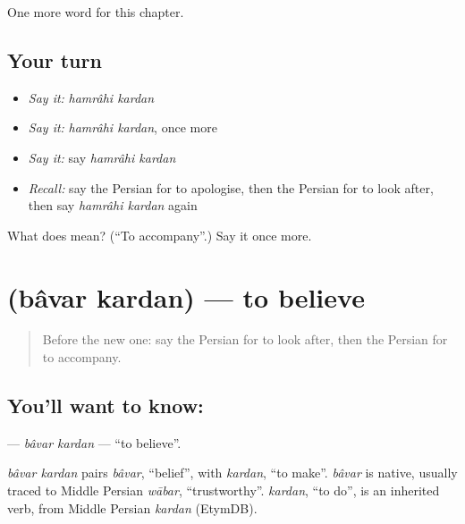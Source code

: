 \begin{grammarlens}[title={What you've built}]
One more word for this chapter.
\end{grammarlens}

\subsection*{Your turn}
\begin{itemize}
\raggedright
  \item \emph{Say it:} \emph{hamrâhi kardan}
  \item \emph{Say it:} \emph{hamrâhi kardan}, once more
  \item \emph{Say it:} say \emph{hamrâhi kardan}
  \item \emph{Recall:} say the Persian for to apologise, then the Persian for to look after, then say \emph{hamrâhi kardan} again
\end{itemize}

\begin{tcolorbox}[breakable,colback=teal!4,colframe=teal!35!black,title={Before you move on}]
What does   mean? (\textquotedblleft{}To accompany\textquotedblright{}.) Say it once more.
\end{tcolorbox}
\section[\texorpdfstring{\fa{باور} \fa{کردن} (bâvar kardan)}{باور کردن (bâvar kardan)}]{  (bâvar kardan) — to believe}

\label{lesson:FA-C145-bavar-kardan}



\begin{quote}
Before the new one: say the Persian for to look after, then the Persian for to accompany.
\end{quote}

\subsection*{You'll want to know:  }
\textbf{ } — \emph{bâvar kardan} — \textquotedblleft{}to believe\textquotedblright{}.

\begin{cousinweb}
\emph{bâvar kardan} pairs \emph{bâvar}, \textquotedblleft{}belief\textquotedblright{}, with \emph{kardan}, \textquotedblleft{}to make\textquotedblright{}. \emph{bâvar} is native, usually traced to Middle Persian \emph{wābar}, \textquotedblleft{}trustworthy\textquotedblright{}. \emph{kardan}, \textquotedblleft{}to do\textquotedblright{}, is an inherited verb, from Middle Persian \emph{kardan} (EtymDB).
\end{cousinweb}

